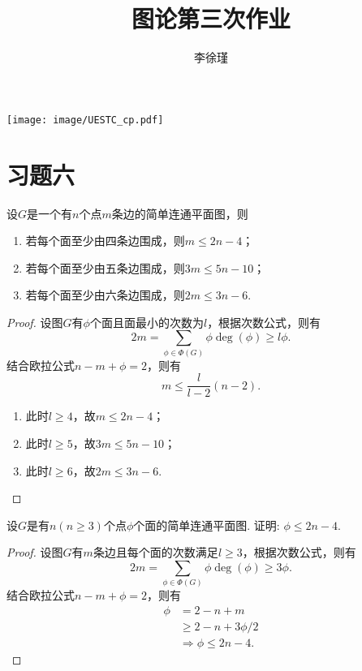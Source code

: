 \documentclass[cn,blue,normal,founder,11pt]{elegantnote}
\title{图论第三次作业}
\institute{数学科学学院}
\author{李徐瑾\quad 202021110109}
\date{\zhtoday}
\begin{document}
\maketitle

\centerline{\texttt{[image: image/UESTC\_cp.pdf]}}
\section{习题六}

\begin{example}
	设\(G\)是一个有\(n\)个点\(m\)条边的简单连通平面图，则
	\begin{enumerate}[(1)]
		\item 若每个面至少由四条边围成，则\(m\leqslant 2n-4\)；
		\item 若每个面至少由五条边围成，则\(3m\leqslant 5n-10\)；
		\item 若每个面至少由六条边围成，则\(2m\leqslant 3n-6\).
	\end{enumerate}
\end{example}

\begin{proof}
设图\(G\)有\(\phi\)个面且面最小的次数为\(l\)，根据次数公式，则有
\[2m=\sum_{\phi\in\Phi(G)}\phi\deg(\phi)\geqslant l\phi.\]
结合欧拉公式\(n-m+\phi=2\)，则有
\[m\leqslant\frac{l}{l-2}(n-2).\]
\begin{enumerate}[(1)]
	\item 此时\(l\geqslant 4\)，故\(m\leqslant 2n-4\)；
	\item 此时\(l\geqslant 5\)，故\(3m\leqslant 5n-10\)；
	\item 此时\(l\geqslant 6\)，故\(2m\leqslant 3n-6\).  
\end{enumerate}
\end{proof}

\begin{example}
	设\(G\)是有\(n(n\geqslant 3)\)个点\(\phi\)个面的简单连通平面图. 证明: \(\phi\leqslant 2n-4\).
\end{example}

\begin{proof}
	设图\(G\)有\(m\)条边且每个面的次数满足\(l\geqslant 3\)，根据次数公式，则有
	\[2m=\sum_{\phi\in\Phi(G)}\phi\deg(\phi)\geqslant 3\phi.\]
	结合欧拉公式\(n-m+\phi=2\)，则有
	\begin{align*}
		\phi&=2-n+m\\
		&\geqslant 2-n+3\phi/2\\
		&\Rightarrow\phi\leqslant 2n-4.
	\end{align*}
\end{proof}
\end{document}
